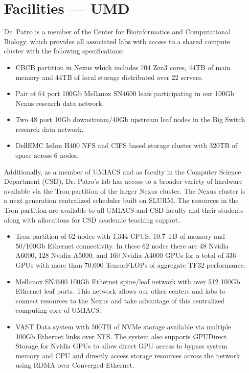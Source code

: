 \section*{Facilities ---  UMD}

Dr. Patro is a member of the Center for Bioinformatics and Computational Biology, which provides all associated labs with access to a shared compute cluster with the following specifications:

\begin{itemize}
\item CBCB partition in Nexus which includes 704 Zen3 cores, 44TB of main memory and 44TB of local storage distributed over 22 servers.
\item Pair of 64 port 100Gb Mellanox SN4600 leafs participating in our 100Gb Nexus research data network. 
\item Two 48 port 10Gb downstream/40Gb upstream leaf nodes in the Big Switch research data network.
\item DellEMC Isilon H400 NFS and CIFS based storage cluster with 320TB of space across 6 nodes.
\end{itemize}

Additionally, as a member of UMIACS and as faculty in the Computer Science Department (CSD), Dr. Patro’s lab has access to a broader variety of hardware available via the Tron partition of the larger Nexus cluster. The Nexus cluster is a next generation centralized scheduler built on SLURM. The resources in the Tron partition are available to all UMIACS and CSD faculty and their students along with allocations for CSD academic teaching support.

\begin{itemize}
\item Tron partition of 62 nodes with 1,344 CPUS, 10.7 TB of memory and 50/100Gb Ethernet connectivity.  In these 62 nodes there are 48 Nvidia A6000, 128 Nvidia A5000, and 160 Nvidia A4000 GPUs for a total of 336 GPUs with more than 70,000 TensorFLOPs of aggregate TF32 performance.  
\item Mellanox SN4600 100Gb Ethernet spine/leaf network with over 512 100Gb Ethernet leaf ports.  This network allows our other centers and labs to connect resources to the Nexus and take advantage of this centralized computing core of UMIACS.
\item VAST Data system with 500TB of NVMe storage available via multiple 100Gb Ethernet links over NFS.  The system also supports GPUDirect Storage for Nvidia GPUs to allow direct GPU access to bypass system memory and CPU and directly access storage resources across the network using RDMA over Converged Ethernet.
\end{itemize}

